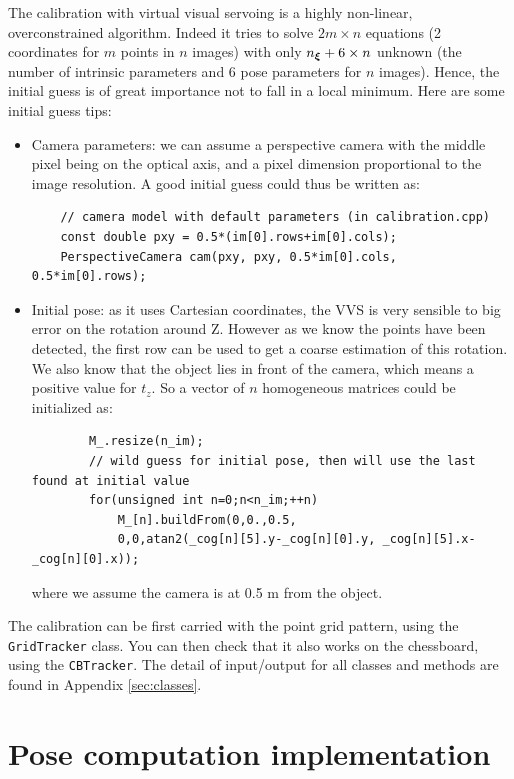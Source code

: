 \documentclass{ecnreport}
\begin{document}
The calibration with virtual visual servoing is a highly non-linear, overconstrained algorithm. Indeed it tries to solve $2m\times n$ equations (2 coordinates for $m$ points in $n$ images) with
only $n_{\boldsymbol{\xi}} + 6\times n$ unknown (the number of intrinsic parameters and 6 pose parameters for $n$ images). Hence, the initial guess is of great importance
not to fall in a local minimum. Here are some initial guess tips:
\begin{itemize}
 \item Camera parameters: we can assume a perspective camera with the middle pixel being on the optical axis, and a pixel dimension proportional to the image resolution. 
 A good initial guess could thus be written as:
 \begin{center}\cppstyle
\begin{lstlisting}
    // camera model with default parameters (in calibration.cpp)
    const double pxy = 0.5*(im[0].rows+im[0].cols);
    PerspectiveCamera cam(pxy, pxy, 0.5*im[0].cols, 0.5*im[0].rows);
\end{lstlisting}
\end{center}
\item Initial pose: as it uses Cartesian coordinates, the VVS is very sensible to big error on the rotation around Z. However as we know the points have been detected, the first row can be used to 
get a coarse estimation of this rotation. We also know that the object lies in front of the camera, which means a positive value for $t_z$. So a vector of $n$ homogeneous matrices could be initialized as:
 \begin{center}\cppstyle
\begin{lstlisting}
        M_.resize(n_im);
        // wild guess for initial pose, then will use the last found at initial value
        for(unsigned int n=0;n<n_im;++n)
            M_[n].buildFrom(0,0.,0.5,
            0,0,atan2(_cog[n][5].y-_cog[n][0].y, _cog[n][5].x-_cog[n][0].x));
\end{lstlisting}
\end{center}where we assume the camera is at 0.5 m from the object.
\end{itemize}

The calibration can be first carried with the point grid pattern, using the \texttt{GridTracker} class. You can then check that it also works on the chessboard, 
using the \texttt{CBTracker}. The detail of input/output for all classes and methods are found in Appendix \ref{sec:classes}.


\section{Pose computation implementation}
\end{document}
